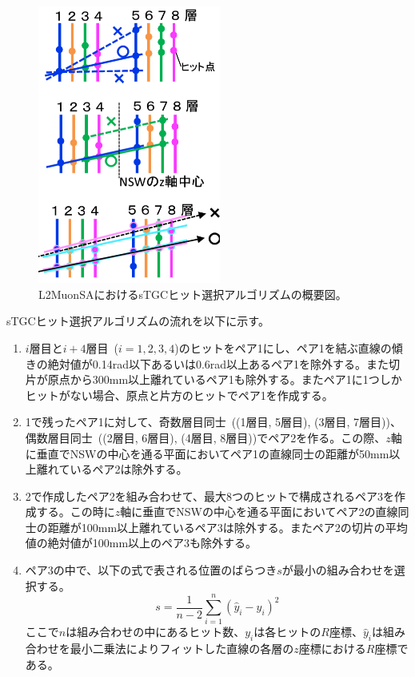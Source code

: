 \begin{figure}[h]
  \centering
  \includegraphics[clip, width=6cm]{fig/5/sTGC_hitSelectAlg.png}
  \caption{L2MuonSAにおけるsTGCヒット選択アルゴリズムの概要図\cite{article:kumaokaJPS}。}
  \label{fig:5-1}
\end{figure}

sTGCヒット選択アルゴリズムの流れを以下に示す。
\begin{enumerate}
    \item $i$層目と$i+4$層目~($i=1, 2, 3, 4$)のヒットをペア1にし、ペア1を結ぶ直線の傾きの絶対値が0.14rad以下あるいは0.6rad以上あるペア1を除外する。また切片が原点から300mm以上離れているペア1も除外する。またペア1に1つしかヒットがない場合、原点と片方のヒットでペア1を作成する。
    \item 1で残ったペア1に対して、奇数層目同士~((1層目, 5層目), (3層目, 7層目))、偶数層目同士~((2層目, 6層目), (4層目, 8層目))でペア2を作る。この際、$z$軸に垂直でNSWの中心を通る平面においてペア1の直線同士の距離が50mm以上離れているペア2は除外する。
    \item 2で作成したペア2を組み合わせて、最大8つのヒットで構成されるペア3を作成する。この時に$z$軸に垂直でNSWの中心を通る平面においてペア2の直線同士の距離が100mm以上離れているペア3は除外する。またペア2の切片の平均値の絶対値が100mm以上のペア3も除外する。
    \item ペア3の中で、以下の式で表される位置のばらつき$s$が最小の組み合わせを選択する。
    \begin{equation}
        s=\frac{1}{n-2} \sum_{i=1}^n\left(\hat{y}_i-y_i\right)^2\label{equ-5-1}
    \end{equation}
    ここで$n$は組み合わせの中にあるヒット数、$y_i$は各ヒットの$R$座標、$\hat{y}_i$は組み合わせを最小二乗法によりフィットした直線の各層の$z$座標における$R$座標である。
\end{enumerate}

